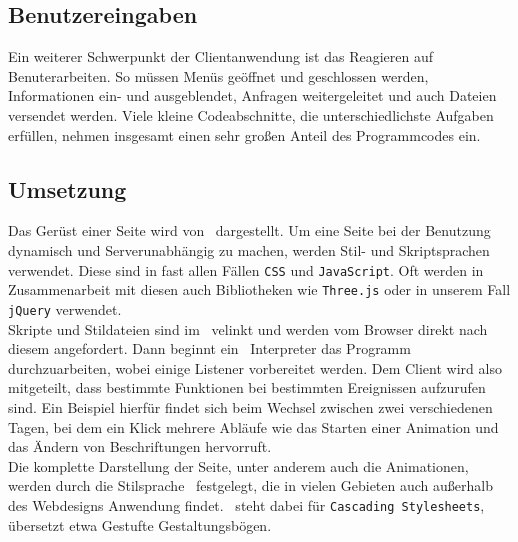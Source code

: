 \subsection{Benutzereingaben}
Ein weiterer Schwerpunkt der Clientanwendung ist das Reagieren auf Benuterarbeiten. So müssen Menüs geöffnet und geschlossen werden, Informationen ein- und ausgeblendet, Anfragen weitergeleitet und auch Dateien versendet werden. Viele kleine Codeabschnitte, die unterschiedlichste Aufgaben erfüllen, nehmen insgesamt einen sehr großen Anteil des Programmcodes ein.

\subsection{Umsetzung}
Das Gerüst einer Seite wird von \HTML\ dargestellt. Um eine Seite bei der Benutzung dynamisch und Serverunabhängig zu machen, werden Stil- und Skriptsprachen verwendet. Diese sind in fast allen Fällen \texttt{CSS} und \texttt{JavaScript}. Oft werden in Zusammenarbeit mit diesen auch Bibliotheken wie \texttt{Three.js} oder in unserem Fall \texttt{jQuery} verwendet.\\
Skripte und Stildateien sind im \HTML\ velinkt und werden vom Browser direkt nach diesem angefordert. Dann beginnt ein \JavaScript\ Interpreter das Programm durchzuarbeiten, wobei einige Listener vorbereitet werden. Dem Client wird also mitgeteilt, dass bestimmte Funktionen bei bestimmten Ereignissen aufzurufen sind. Ein Beispiel hierfür findet sich beim Wechsel zwischen zwei verschiedenen Tagen, bei dem ein Klick mehrere Abläufe wie das Starten einer Animation und das Ändern von Beschriftungen hervorruft.\\
Die komplette Darstellung der Seite, unter anderem auch die Animationen, werden durch die Stilsprache \CSS\ festgelegt, die in vielen Gebieten auch außerhalb des Webdesigns Anwendung findet. \CSS\ steht dabei für \texttt{Cascading Stylesheets}, übersetzt etwa \glqq Gestufte Gestaltungsbögen\grqq.
